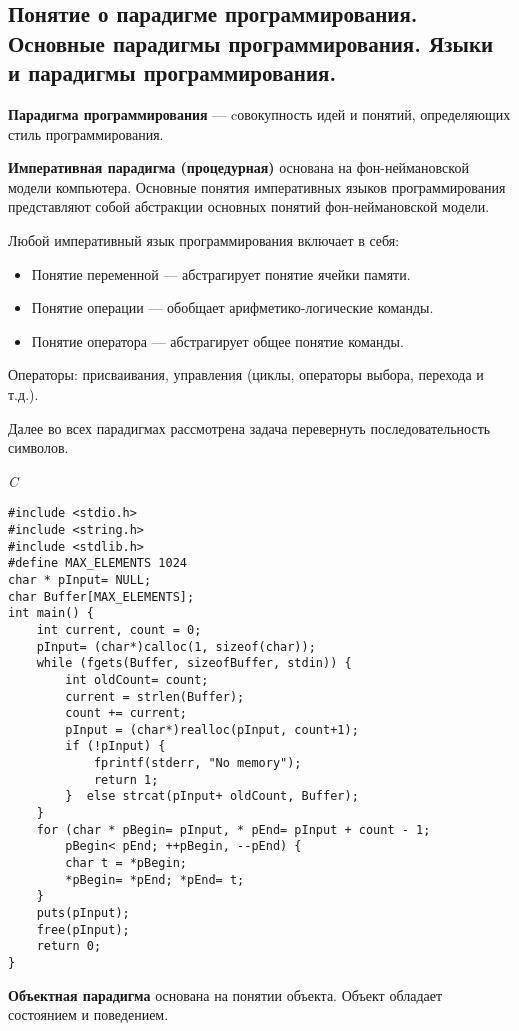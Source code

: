\subsection{Понятие  о  парадигме  программирования.  Основные  парадигмы  программирования.  Языки  и  парадигмы программирования.}

\textbf{Парадигма программирования} --- cовокупность идей и понятий, определяющих стиль программирования.

\textbf{Императивная парадигма (процедурная)} основана на фон-неймановской модели компьютера. 
Основные понятия императивных языков программирования представляют собой абстракции основных понятий фон-неймановской модели. 

Любой императивный язык программирования включает в себя:
\begin{itemize}
    \item Понятие переменной --- абстрагирует понятие ячейки памяти.
    \item Понятие операции --- обобщает арифметико-логические команды.
    \item Понятие оператора --- абстрагирует общее понятие команды.
\end{itemize}

Операторы: присваивания, управления (циклы, операторы выбора, перехода и т.д.).

Далее во всех парадигмах рассмотрена задача перевернуть последовательность символов.

\textit{C}
\begin{lstlisting}[basicstyle=\ttfamily\small, frame=single] 
#include <stdio.h>
#include <string.h>
#include <stdlib.h>
#define MAX_ELEMENTS 1024
char * pInput= NULL;
char Buffer[MAX_ELEMENTS];
int main() {
    int current, count = 0;
    pInput= (char*)calloc(1, sizeof(char));
    while (fgets(Buffer, sizeofBuffer, stdin)) {
        int oldCount= count;
        current = strlen(Buffer);
        count += current;
        pInput = (char*)realloc(pInput, count+1);
        if (!pInput) {
            fprintf(stderr, "No memory");
            return 1;
        }  else strcat(pInput+ oldCount, Buffer);
    }
    for (char * pBegin= pInput, * pEnd= pInput + count - 1; 
        pBegin< pEnd; ++pBegin, --pEnd) {
        char t = *pBegin;
        *pBegin= *pEnd; *pEnd= t;
    }
    puts(pInput); 
    free(pInput);
    return 0;
}
    \end{lstlisting}
    
\bigbreak
\textbf{Объектная парадигма} основана на понятии объекта. 
Объект обладает состоянием и поведением.

